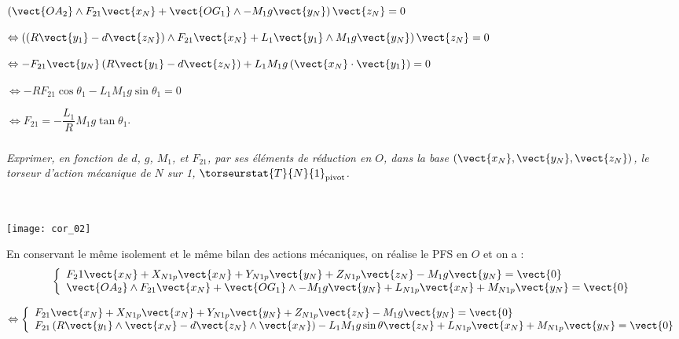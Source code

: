 \begin{multicols}{2}
\begin{corrige}
\noindent
$\left(\vect{OA_2}\wedge F_{21}\vect{x_N}  + 
\vect{OG_1}\wedge -M_1g\vect{y_N} \right) \vect{z_N} = {0}$ 

\noindent
$\Leftrightarrow  \left(\left( R\vect{y_1} - d\vect{z_N}\right)\wedge F_{21}\vect{x_N}  
+L_1\vect{y_1}\wedge M_1g\vect{y_N} \right) \vect{z_N} = {0}$

\noindent
$\Leftrightarrow 
-F_{21}\vect{y_N}\left( R\vect{y_1} - d\vect{z_N}\right)  
+L_1 M_1g\left(\vect{x_N} \cdot \vect{y_1}\right) = {0}$
\noindent

\noindent
$\Leftrightarrow 
-RF_{21}\cos \theta_1
-L_1 M_1g\sin\theta_1 = {0}$

\noindent
$\Leftrightarrow F_{21}=-\dfrac{L_1}{R} M_1g\tan\theta_1 $.

\end{corrige}
\else
\fi

\subparagraph{}\textit{Exprimer, en fonction de $d$, $g$,
$M_1$, et $F_{21}$, par ses éléments de réduction en $O$, dans la base $\left( \vect{x_N} , \vect{y_N} , \vect{z_N} \right)$, le torseur d’action mécanique de $N$
sur 1, $\torseurstat{T}{N}{1}_{\text{pivot}}$.}
\ifprof
\begin{corrige} ~\\

\begin{center}
\texttt{[image: cor\_02]}
\end{center}


En conservant le même isolement et le même bilan des actions mécaniques, on réalise le PFS en $O$ et on a : 
$$
\left\{
\begin{array}{l}
F_21\vect{x_N}+X_{N1p}\vect{x_N}+Y_{N1p}\vect{y_N}+Z_{N1p}\vect{z_N} - M_1g\vect{y_N} = \vect{0}\\
\vect{OA_2}\wedge F_{21}\vect{x_N}  + 
\vect{OG_1}\wedge -M_1g\vect{y_N}  +L_{N1p}\vect{x_N}+M_{N1p}\vect{y_N}= \vect{0} \\
\end{array}
\right.
$$



$$ \Leftrightarrow
\left\{
\begin{array}{l}
F_{21}\vect{x_N}+X_{N1p}\vect{x_N}+Y_{N1p}\vect{y_N}+Z_{N1p}\vect{z_N} - M_1g\vect{y_N} = \vect{0}\\
 F_{21}\left( R\vect{y_1} \wedge \vect{x_N}- d\vect{z_N}\wedge \vect{x_N}\right)  
-L_1M_1g \sin \theta \vect{z_N} +L_{N1p}\vect{x_N}+M_{N1p}\vect{y_N} = \vect{0} \\
\end{array}
\right.
$$


\end{corrige}
\end{multicols}
